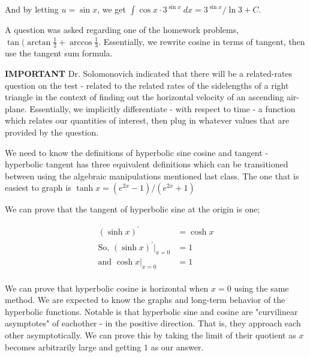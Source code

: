 \documentclass{article}
\begin{document}
\vspace{10pt}

And by letting $u=\sin x$, we get $\int\cos x\cdot3^{\sin x}\ dx=3^{\sin x}/\ln3+C$.

\vspace{10pt}

A question was asked regarding one of the homework problems, $\tan(\arctan\frac{1}{2}+\arccos\frac{1}{3}$. Essentially, we rewrite cosine in terms of tangent, then use the tangent sum formula.

\vspace{10pt}

{\bf{}IMPORTANT} Dr. Solomonovich indicated that there will be a related-rates question on the test - related to the related rates of the sidelengths of a right triangle in the context of finding out the horizontal velocity of an ascending air-plane. Essentially, we implicitly differentiate - with respect to time - a function which relates our quantities of interest, then plug in whatever values that are provided by the question.

\vspace{10pt}

We need to know the definitions of hyperbolic sine cosine and tangent - hyperbolic tangent has three equivalent definitions which can be transitioned between using the algebraic manipulations mentioned last class. The one that is easiest to graph is $\tanh x=(e^{2x}-1)/(e^{2x}+1)$

\vspace{10pt}

We can prove that the tangent of hyperbolic sine at the origin is one;

\begin{align*}
(\sinh x)^\prime&=\cosh x\\
\mbox{So, }(\sinh x)^\prime\big|_{x=0}&=1\\
\mbox{and }\cosh x\big|_{x=0}&=1\\
\end{align*}

\vspace{10pt}

We can prove that hyperbolic cosine is horizontal when $x=0$ using the same method. We are expected to know the graphs and long-term behavior of the hyperbolic functions. Notable is that hyperbolic sine and cosine are "curvilinear asymptotes" of eachother - in the positive direction. That is, they approach each other asymptotically. We can prove this by taking the limit of their quotient as $x$ becomes arbitrarily large and getting $1$ as our answer.
\end{document}
